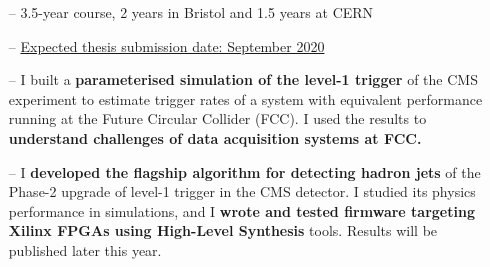 \documentclass[10pt,a4paper]{altacv}
\begin{document}

%

\begin{fullwidth}
\makecvheader
\end{fullwidth}

%





\begin{itemize}
    \setlength{\itemindent}{0.5em}
    \item[--]   \small{3.5-year course, 2 years in Bristol and 1.5 years at CERN}
    \item[--]   \small{\underline{Expected thesis submission date: September 2020}}
    \item[--]   \small{I built a \textbf{parameterised simulation of the level-1 trigger} of the CMS experiment to estimate trigger rates of a system with equivalent performance running at the Future Circular Collider (FCC). I used the results to \textbf{understand challenges of data acquisition systems at FCC.}}
    \item[--]   \small{I \textbf{developed the flagship algorithm for detecting hadron jets} of the Phase-2 upgrade of level-1 trigger in the CMS detector. I studied its physics performance in simulations, and I \textbf{wrote and tested firmware targeting Xilinx FPGAs using High-Level Synthesis} tools. 
    Results will be published later this year.}
\end{itemize}

\medskip


\end{document}
